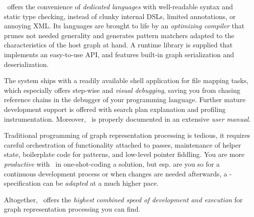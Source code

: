 \GrG\ offers the convenience of \emph{dedicated languages} with well-readable syntax and static type checking, instead of clunky internal DSLs, limited annotations, or annoying XML.
Its languages are brought to life by an \emph{optimizing compiler} that prunes not needed generality and generates pattern matchers adapted to the characteristics of the host graph at hand.
A runtime library is supplied that implements an easy-to-use API, and features built-in graph serialization and deserialization.

The system ships with a readily available shell application for file mapping tasks, which especially offers step-wise and \emph{visual debugging}, saving you from chasing reference chains in the debugger of your programming language.
Further mature development support is offered with search plan explanation and profiling instrumentation. 
Moreover, \GrG\ is properly documented in an extensive \emph{user manual}.

Traditional programming of graph representation processing is tedious, it requires careful orchestration of functionality attached to passes, maintenance of helper state, boilerplate code for patterns, and low-level pointer fiddling.
You are more \emph{productive} with \GrG\ in one-shot-coding a solution, but esp. are you so for a continuous development process or when changes are needed afterwards, a \GrG-specification can be \emph{adapted} at a much higher pace.

Altogether, \GrG\ offers the \emph{highest combined speed of development and execution} for graph representation processing you can find.



